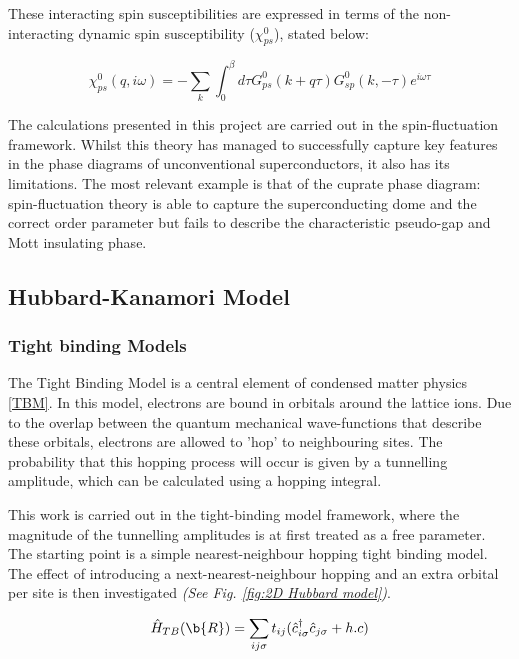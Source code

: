 \documentclass[12pt]{article}
\begin{document}
\noindent These interacting spin susceptibilities are expressed in terms of the non-interacting dynamic spin susceptibility ($\chi_{ps}^0$)\cite{moriya2000spin}, stated below: 

\begin{equation}\label{chi 0}
    \chi_{ps}^0(q, i \omega) = -\sum_{k} \int_{0}^{\beta} d\tau G^0_{ps}(k+q \tau) G^0_{sp}(k, -\tau)e^{i\omega \tau}
\end{equation} 

\noindent The calculations presented in this project are carried out in the spin-fluctuation framework. 
Whilst this theory has managed to successfully capture key features in the phase diagrams of unconventional superconductors, it also has its limitations.
The most relevant example is that of the cuprate phase diagram:
spin-fluctuation theory is able to capture the superconducting dome and the correct order parameter \cite{moriya2006developments, scalapino1995case} 
but fails
to describe the characteristic pseudo-gap and Mott insulating phase\cite{timusk1999pseudogap}.


\subsection{Hubbard-Kanamori Model}

\subsubsection{Tight binding Models}

The Tight Binding Model is a central element of condensed matter physics \eqref{TBM}. In this model, electrons are bound in orbitals around the lattice ions.
Due to the overlap between the quantum mechanical wave-functions that describe these orbitals, electrons are allowed to 'hop' to neighbouring sites. The probability that this hopping process will occur is given by a tunnelling amplitude, which can be calculated using a hopping integral. \par
\medskip
\noindent This work is carried out in the tight-binding model framework, where the magnitude of the tunnelling amplitudes is at first treated as a free parameter. 
The starting point is a simple nearest-neighbour hopping tight binding model. 
The effect of introducing a next-nearest-neighbour hopping and an extra orbital per site
is then investigated \textit{(See Fig. \ref{fig:2D Hubbard model})}.



\begin{equation} \label{TBM}
    \hat{H}_{TB}(\b{R}) = \sum_{ij\sigma} t_{ij}(\hat{c}_{i\sigma}^{\dagger}\hat{c}_{j \sigma} + h.c)
\end{equation}
\end{document}
